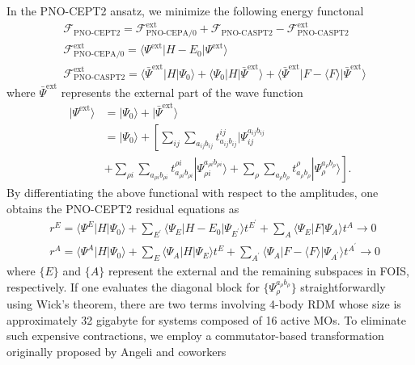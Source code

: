 \documentclass[aip,jcp,amsmath,twocolumn,floatfix,reprint,fleqn]{revtex4-1}
\begin{document}
%
In the PNO-CEPT2 ansatz, we minimize the following energy functonal
%
\begin{align}
  &\mathscr{F}_\text{PNO-CEPT2} = \mathscr{F}_\text{PNO-CEPA/0}^\text{ext}+\mathscr{F}_\text{PNO-CASPT2}-\mathscr{F}_\text{PNO-CASPT2}^\text{ext} \label{eq:F-CEPT2} \\
  &\mathscr{F}_\text{PNO-CEPA/0}^\text{ext} = \langle\Psi^\text{ext}|H-E_0|\Psi^\text{ext}\rangle \label{eq:F-CEPA/0} \\
  &\mathscr{F}_\text{PNO-CASPT2}^\text{ext} = \langle\bar{\Psi}^\text{ext}|H|\Psi_0\rangle + \langle\Psi_0|H|\bar{\Psi}^\text{ext}\rangle+\langle\bar{\Psi}^\text{ext}|F-\langle F\rangle|\bar{\Psi}^\text{ext}\rangle \label{eq:F-CASPT2}
\end{align}
%
where $\bar{\Psi}^\text{ext}$ represents the external part of the wave function
%
\begin{align}
  |\Psi^\text{ext}\rangle&=|\Psi_0\rangle+|\bar{\Psi}^\text{ext}\rangle \nonumber \\
  &=|\Psi_0\rangle+\left[\sum_{ij}\sum_{a_{ij}b_{ij}} t_{a_{ij}b_{ij}}^{ij}|\Psi^{a_{ij}b_{ij}}_{ij} \right. \nonumber \\
    &+ \left.\sum_{\rho i}\sum_{a_{\rho i}b_{\rho i}} t_{a_{\rho i}b_{\rho i}}^{\rho i}|\Psi^{a_{\rho i}b_{\rho i}}_{\rho i}\rangle + \sum_{\rho}\sum_{a_{\rho}b_{\rho}} t_{a_{\rho}b_{\rho}}^{\rho}|\Psi^{a_{\rho}b_{\rho}}_{\rho}\rangle\right].
\end{align}
%
By differentiating the above functional with respect to the amplitudes, one obtains the PNO-CEPT2 residual equations as
%
\begin{align}
  &r^{E}=\langle\Psi^{E}|H|\Psi_0\rangle+\sum_{E^{'}}\langle\Psi_E|H-E_0|\Psi_{E^{'}}\rangle t^{E^{'}}+\sum_{A}\langle\Psi_E|F|\Psi_A\rangle t^A \rightarrow 0 \label{eq:CEPT-E} \\
  &r^{A}=\langle\Psi^{A}|H|\Psi_0\rangle+\sum_{E}\langle\Psi_A|H|\Psi_E\rangle t^E+\sum_{A^{'}}\langle\Psi_A|F-\langle F\rangle|\Psi_{A^{'}}\rangle t^{A^{'}} \rightarrow 0 \label{eq:CEPT-A}
\end{align}
%
where $\{E\}$ and $\{A\}$ represent the external and the remaining subspaces in FOIS, respectively.
%
If one evaluates the diagonal block for $\{\Psi_{\rho}^{a_{\rho}b_{\rho}}\}$ straightforwardly using Wick's theorem, there are two terms involving 4-body RDM whose size is approximately 32 gigabyte for systems composed of 16 active MOs.
%
To eliminate such expensive contractions, we employ a commutator-based transformation originally proposed by Angeli and coworkers\cite{angeliintroduction2001,angelin-electron2002,angelinew2006}
\end{document}
